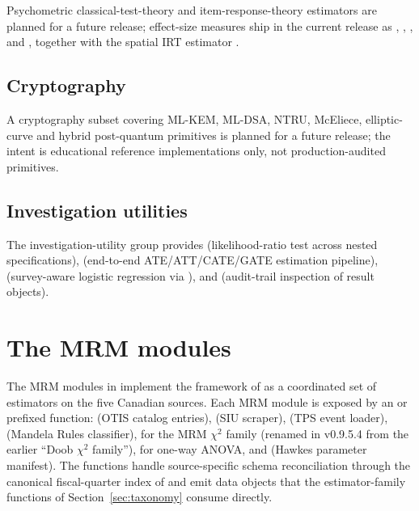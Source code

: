 \documentclass[article,shortnames,nojss]{jss}
\begin{document}
Psychometric classical-test-theory and item-response-theory
estimators are planned for a future release; effect-size measures
ship in the current release as ,
, , and
, together with the spatial IRT
estimator .

\subsection{Cryptography}

A cryptography subset covering ML-KEM, ML-DSA, NTRU, McEliece,
elliptic-curve and hybrid post-quantum primitives is planned for
a future release; the intent is educational reference
implementations only, not production-audited primitives.

\subsection{Investigation utilities}

The investigation-utility group provides
 (likelihood-ratio
test across nested specifications),
 (end-to-end
ATE/ATT/CATE/GATE estimation pipeline),
 (survey-aware
logistic regression via ), and
 (audit-trail inspection of result
objects).

\section{The MRM modules}
\label{sec:mrm}

The MRM modules in  implement the framework of
\citet{Ruhela2026MRM} as a coordinated set of estimators on the
five Canadian sources. Each MRM module is exposed by an  or 
prefixed function:  (OTIS catalog
entries),  (SIU scraper),
 (TPS event loader),
 (Mandela Rules classifier),
 for the MRM $\chi^2$ family
(renamed in v0.9.5.4 from the earlier ``Doob $\chi^2$ family''),
 for one-way ANOVA, and
 (Hawkes parameter manifest). The functions handle source-specific
schema reconciliation through the canonical fiscal-quarter index
of \citet{Ruhela2026MRM} and emit data objects that the
estimator-family functions of Section~\ref{sec:taxonomy} consume
directly.
\end{document}
